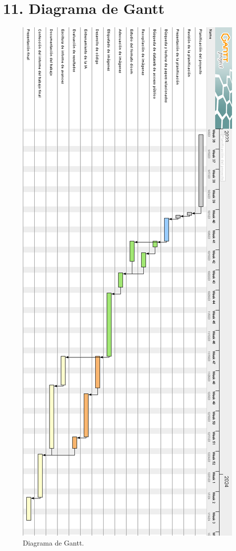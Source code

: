 \documentclass[
11pt, %
]{charter}
\begin{document}
\section{11. Diagrama de Gantt}
\label{sec:gantt}


\begin{figure}[htpb]
\centering 
\includegraphics[height=.74\textheight]{./Figuras/GANTCEIA.png}
\caption{Diagrama de Gantt.}
\label{fig:diagGantt}
\end{figure}
\end{document}
